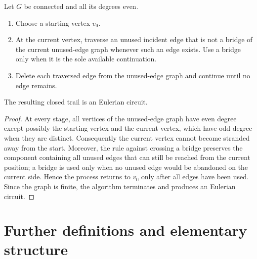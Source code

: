 \begin{notealgorithm}
Let $G$ be connected and all its degrees even.
\begin{enumerate}
  \item Choose a starting vertex $v_0$.
  \item At the current vertex, traverse an unused incident edge that is not a bridge of the current unused-edge graph whenever such an edge exists.  Use a bridge only when it is the sole available continuation.
  \item Delete each traversed edge from the unused-edge graph and continue until no edge remains.
\end{enumerate}
The resulting closed trail is an Eulerian circuit.
\end{notealgorithm}
\begin{proof}
At every stage, all vertices of the unused-edge graph have even degree except possibly the starting vertex and the current vertex, which have odd degree when they are distinct.  Consequently the current vertex cannot become stranded away from the start.  Moreover, the rule against crossing a bridge preserves the component containing all unused edges that can still be reached from the current position; a bridge is used only when no unused edge would be abandoned on the current side.  Hence the process returns to $v_0$ only after all edges have been used.  Since the graph is finite, the algorithm terminates and produces an Eulerian circuit.
\end{proof}
\section{Further definitions and elementary structure}

